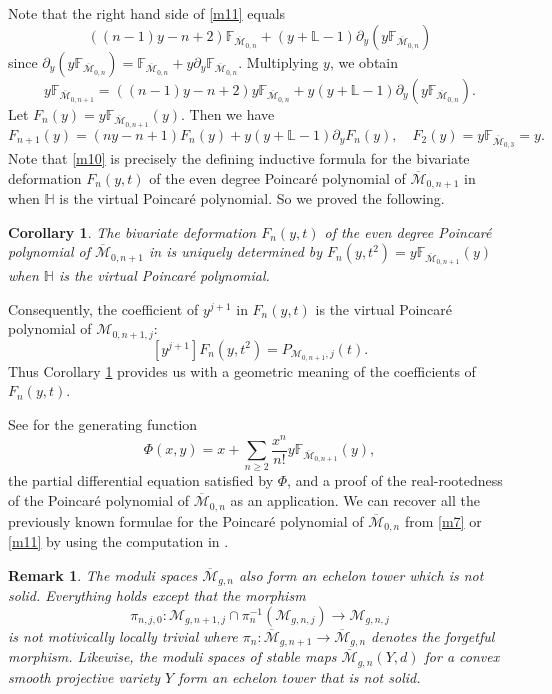 \documentclass[11pt]{amsart}
\newtheorem{corollary}[theorem]{Corollary}
\newtheorem{remark}[theorem]{Remark}
\newcommand{\Mbarzn}{\overline{\mathcal M}_{0,n}}
\newcommand{\Mbargn}{\overline{\mathcal M}_{g,n}}
\newcommand{\cM}{\mathcal{M}}
\newcommand{\bcM}{\overline{\cM}}
\def\cM{\mathcal{M}}
\def\LL{\mathbb{L}}
\def\lra{\longrightarrow}
\def\beq{\begin{equation}}
\def\eeq{\end{equation}}
\def\HH{\mathbb{H}}
\def\FF{\mathbb{F}}
\begin{document}
Note that the right hand side of \eqref{m11} equals $$((n-1)y-n+2)\FF_{\Mbarzn}+(y+\LL-1)\partial_y(y\FF_{\Mbarzn})$$
since $\partial_y(y \FF_{\Mbarzn})=\FF_{\Mbarzn}+y\partial_y\FF_{\Mbarzn}$. Multiplying $y$, we obtain 
$$y\FF_{\bcM_{0,n+1}}=((n-1)y-n+2)y\FF_{\Mbarzn}+y(y+\LL-1)\partial_y(y\FF_{\Mbarzn}).$$
Let $F_{n}(y)=y\FF_{\bcM_{0,n+1}}(y)$. Then we have 
\beq\label{m10}
F_{n+1}(y)=(ny-n+1)F_n(y)+y(y+\LL-1)\partial_yF_n(y), \quad F_2(y)=y\FF_{\bcM_{0,3}}=y. 
\eeq
Note that \eqref{m10} is precisely the defining inductive formula for the bivariate deformation $F_n(y,t)$ of the even degree Poincar\'e polynomial of $\bcM_{0,n+1}$ in \cite[Definition 2.2]{BercziKiem2026} when $\HH$ is the virtual Poincar\'e polynomial. So we proved the following.
\begin{corollary}\label{m17}
    The bivariate deformation $F_n(y,t)$ of the even degree Poincar\'e polynomial %
    of $\bcM_{0,n+1}$ in \cite{BercziKiem2026} is uniquely determined by   $F_n(y,t^2)=y\FF_{\bcM_{0,n+1}}(y)$ when $\HH$ is the virtual Poincar\'e polynomial.   
\end{corollary}
Consequently, the coefficient of $y^{j+1}$ in $F_n(y,t)$ is the virtual Poincar\'e polynomial of $\cM_{0,n+1,j}$:
\beq\label{m12}
[y^{j+1}]F_n(y,t^2)=P_{\cM_{0,n+1},j}({t}).\eeq
Thus Corollary \ref{m17} provides us with a geometric meaning of the coefficients of $F_n(y,t)$. 

See \cite{BercziKiem2026} 
for the generating function $$\Phi(x,y)=x+\sum_{n\ge 2}\frac{x^n}{n!}y\FF_{\bcM_{0,n+1}}(y),$$ the partial differential equation satisfied by $\Phi$, and a proof of the real-rootedness of the Poincar\'e polynomial of $\Mbarzn$ as an application.
We can recover all the previously known formulae for the Poincar\'e polynomial of $\Mbarzn$ from \eqref{m7} or \eqref{m11} by using the computation in \cite{BercziKiem2026}. 

\begin{remark}\label{m18}
    The moduli spaces $\Mbargn$ also form an echelon tower which is not solid. Everything holds except that the morphism $$\pi_{n,j,0}:\cM_{g,n+1,j}\cap \pi_n^{-1}(\cM_{g,n,j})\lra \cM_{g,n,j}$$
    is not motivically locally trivial where $\pi_n:\bcM_{g,n+1}\to \Mbargn$ denotes the forgetful morphism. Likewise, the moduli spaces of stable maps $\bcM_{g,n}(Y,d)$ for a convex smooth projective variety $Y$ form an echelon tower that is not solid. 
\end{remark}

\bigskip
\end{document}
